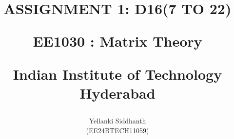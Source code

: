 \documentclass[journal,12pt,twocolumn]{IEEEtran}
\theoremstyle{remark}
\begin{document}
%





\title{
ASSIGNMENT 1: D16(7 TO 22)

\large{EE1030 : Matrix Theory}

Indian Institute of Technology Hyderabad
}
\author{Yellanki Siddhanth

(EE24BTECH11059)
}	





\maketitle

\newpage



\bigskip

\renewcommand{\thefigure}{\theenumi}
\renewcommand{\thetable}{\theenumi}
 
\end{document}
